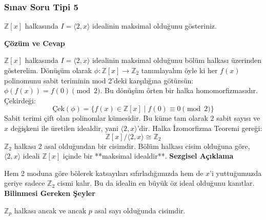\documentclass[11pt, a4paper]{article}
\newenvironment{cozum}{
    \vspace{0.5cm}
    \noindent\textcolor{green!60!black}{\faCheckCircle\enspace \textbf{\Large Çözüm ve Cevap}}\par\vspace{0.2cm}
}{}
\newenvironment{sezgisel}{
    \vspace{0.5cm}
    \noindent\textcolor{orange!80!black}{\faLightbulb\enspace \textbf{\Large Sezgisel Açıklama}}\par\vspace{0.2cm}
    \itshape
}{}
\newenvironment{bilgi}{
    \vspace{0.5cm}
    \noindent\textcolor{red!70!black}{\faExclamationTriangle\enspace \textbf{\Large Bilinmesi Gereken Şeyler}}\par\vspace{0.2cm}
}{}
\begin{document}
\subsubsection{Sınav Soru Tipi 5}
\begin{sinavbox}
$\mathbb{Z}[x]$ halkasında $I = \langle 2, x \rangle$ idealinin maksimal olduğunu gösteriniz.
\end{sinavbox}
\begin{cozum}
$\mathbb{Z}[x]$ halkasında $I = \langle 2, x \rangle$ idealinin maksimal olduğunu bölüm halkası üzerinden gösterelim.
Dönüşüm olarak $\phi: \mathbb{Z}[x] \to \mathbb{Z}_2$ tanımlayalım öyle ki her $f(x)$ polinomunu sabit teriminin mod 2'deki karşılığına götürsün: $\phi(f(x)) = f(0) \pmod 2$.
Bu dönüşüm örten bir halka homomorfizmasıdır. Çekirdeği:
\[ \text{Çek}(\phi) = \{ f(x) \in \mathbb{Z}[x] \mid f(0) \equiv 0 \pmod 2 \} \]
Sabit terimi çift olan polinomlar kümesidir. Bu küme tam olarak $2$ sabit sayısı ve $x$ değişkeni ile üretilen idealdir, yani $\langle 2, x \rangle$'dir.
Halka İzomorfizma Teoremi gereği:
\[ \mathbb{Z}[x] / \langle 2, x \rangle \cong \mathbb{Z}_2 \]
$\mathbb{Z}_2$ halkası 2 asal olduğundan bir cisimdir. Bölüm halkası cisim olduğuna göre, $\langle 2, x \rangle$ ideali $\mathbb{Z}[x]$ içinde bir **maksimal idealdir**.
\end{cozum}
\begin{sezgisel}
Hem 2 moduna göre bölerek katsayıları sıfırladığımızda hem de $x$'i yuttuğumuzda geriye sadece $\mathbb{Z}_2$ cismi kalır. Bu da idealin en büyük öz ideal olduğunu kanıtlar.
\end{sezgisel}
\begin{bilgi}
$\mathbb{Z}_p$ halkası ancak ve ancak $p$ asal sayı olduğunda cisimdir.
\end{bilgi}

\newpage
\end{document}
